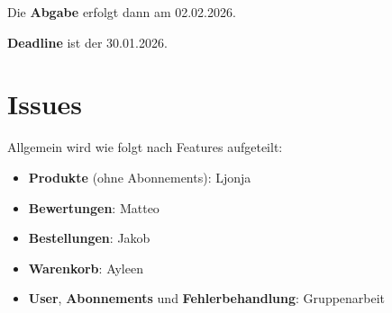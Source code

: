 \documentclass[12pt, a4paper]{scrreprt}
\begin{document}
			Die \textbf{Abgabe} erfolgt dann am 02.02.2026.
			
			\textbf{Deadline} ist der 30.01.2026.
			
		\section{Issues}
		
		Allgemein wird wie folgt nach Features aufgeteilt:
		\begin{itemize}
			\item \textbf{Produkte} (ohne Abonnements): Ljonja
			\item \textbf{Bewertungen}: Matteo
			\item \textbf{Bestellungen}: Jakob
			\item \textbf{Warenkorb}: Ayleen
			\item \textbf{User}, \textbf{Abonnements} und \textbf{Fehlerbehandlung}: Gruppenarbeit 
		\end{itemize}
		
\end{document}
